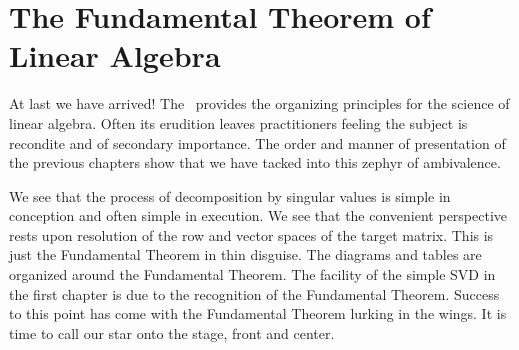 \chapter[The Fundamental Theorem]{The Fundamental Theorem of Linear Algebra}
At last we have arrived! The \ftola \ provides the organizing principles for the science of linear algebra. Often its erudition leaves practitioners feeling the subject is recondite and of secondary importance. The order and manner of presentation of the previous chapters show that we have tacked into this zephyr of ambivalence.

We see that the process of decomposition by singular values is simple in conception and often simple in execution. We see that the convenient perspective rests upon resolution of the row and vector spaces of the target matrix. This is just the Fundamental Theorem in thin disguise. The diagrams and tables are organized around the Fundamental Theorem. The facility of the simple SVD in the first chapter is due to the recognition of the Fundamental Theorem. Success to this point has come with the Fundamental Theorem lurking in the wings. It is time to call our star onto the stage, front and center.






\endinput